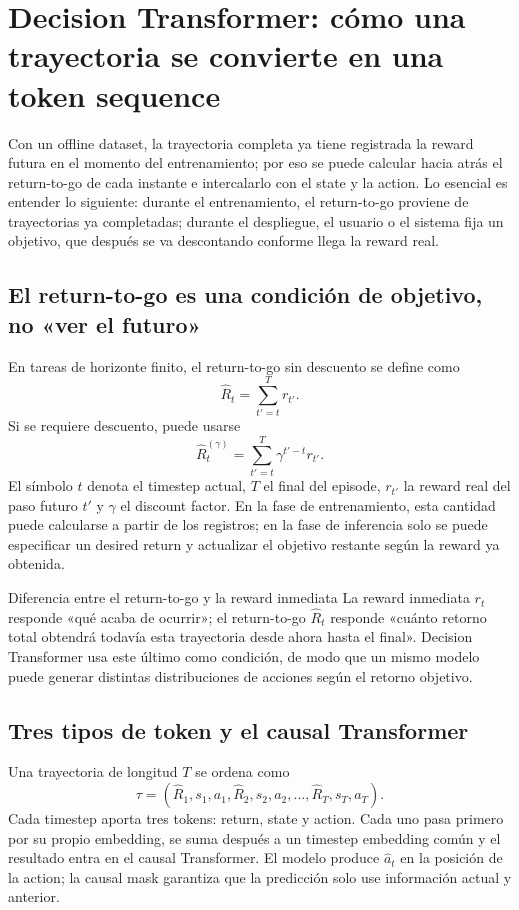 \documentclass[a4paper]{article}
\begin{document}
\section{Decision Transformer: cómo una trayectoria se convierte en una token sequence}

Con un offline dataset, la trayectoria completa ya tiene registrada la reward futura en el momento del entrenamiento; por eso se puede calcular hacia atrás el return-to-go de cada instante e intercalarlo con el state y la action. Lo esencial es entender lo siguiente: durante el entrenamiento, el return-to-go proviene de trayectorias ya completadas; durante el despliegue, el usuario o el sistema fija un objetivo, que después se va descontando conforme llega la reward real.

\subsection{El return-to-go es una condición de objetivo, no «ver el futuro»}

En tareas de horizonte finito, el return-to-go sin descuento se define como
\[
\widehat{R}_t=\sum_{t'=t}^{T}r_{t'}.
\]
Si se requiere descuento, puede usarse
\[
\widehat{R}^{(\gamma)}_t=\sum_{t'=t}^{T}\gamma^{t'-t}r_{t'}.
\]
El símbolo $t$ denota el timestep actual, $T$ el final del episode, $r_{t'}$ la reward real del paso futuro $t'$ y $\gamma$ el discount factor. En la fase de entrenamiento, esta cantidad puede calcularse a partir de los registros; en la fase de inferencia solo se puede especificar un desired return y actualizar el objetivo restante según la reward ya obtenida.

\begin{importantbox}{Diferencia entre el return-to-go y la reward inmediata}
La reward inmediata $r_t$ responde «qué acaba de ocurrir»; el return-to-go $\widehat{R}_t$ responde «cuánto retorno total obtendrá todavía esta trayectoria desde ahora hasta el final». Decision Transformer usa este último como condición, de modo que un mismo modelo puede generar distintas distribuciones de acciones según el retorno objetivo.
\end{importantbox}

\subsection{Tres tipos de token y el causal Transformer}

Una trayectoria de longitud $T$ se ordena como
\[
\tau=(\widehat{R}_1,s_1,a_1,\widehat{R}_2,s_2,a_2,\ldots,\widehat{R}_T,s_T,a_T).
\]
Cada timestep aporta tres tokens: return, state y action. Cada uno pasa primero por su propio embedding, se suma después a un timestep embedding común y el resultado entra en el causal Transformer. El modelo produce $\widehat{a}_t$ en la posición de la action; la causal mask garantiza que la predicción solo use información actual y anterior.
\end{document}
